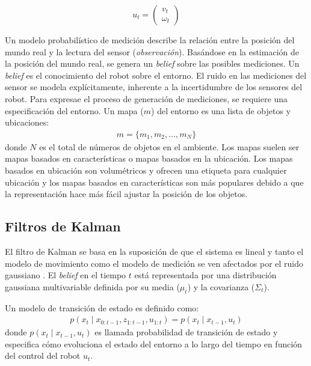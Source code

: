 \begin{equation}
\label{eqn:modelMotion}
u_{t} = \begin{pmatrix}
v_{t} \\
\omega_{t}
\end{pmatrix}
\end{equation}

Un modelo probabil\'istico de medici\'on describe la relaci\'on entre la posici\'on del 
mundo real y la lectura del sensor (\textit{observaci\'on}). Bas\'andose en la 
estimaci\'on de la posici\'on del mundo real, se genera un \textit{belief} sobre las 
posibles mediciones. Un \textit{belief} es el conocimiento del robot sobre el entorno. El 
ruido en las mediciones del sensor se modela expl\'icitamente, inherente a la incertidumbre 
de los sensores del robot. Para expresae el proceso de generaci\'on de mediciones, se requiere 
una especificaci\'on del entorno. Un mapa ($m$) del entorno es una lista de objetos y ubicaciones:
\begin{align}
m =\{m_{1}, m_{2}, \ldots, m_{N}\}
\end{align}
donde $N$ es el total de n\'umeros de objetos en el ambiente. Los mapas suelen ser mapas 
basados en caracter\'isticas o mapas basados en la ubicaci\'on. Los mapas basados en 
ubicación son volumétricos y ofrecen una etiqueta para cualquier ubicación y los mapas basados 
en características son más populares debido a que la representación hace más fácil ajustar la 
posición de los objetos.

\subsection{Filtros de Kalman}
El filtro de Kalman se basa en la suposición de que el sistema es lineal y tanto el modelo de 
movimiento como el modelo de medición se ven afectados por el ruido gaussiano 
\cite{jetto1999development}. El \textit{belief} en el tiempo $t$ está representada por una 
distribución gaussiana multivariable definida por su media ($\mu_{t}$) y la covarianza ($\Sigma_{t}$).

Un modelo de transici\'on de estado es definido como:
\begin{align}
\label{eqn:transicion_estado}
p(x_{t}\mid x_{0:t-1}, z_{1:t-1}, u_{1:t}) = p(x_{t}\mid x_{t-1}, u_{t})
\end{align}
donde $p(x_{t}\mid x_{t-1}, u_{t})$ es llamada probabilidad de transición de estado y 
especifica cómo evoluciona el estado del entorno a lo largo del tiempo en función del 
control del robot $u_{t}$.

